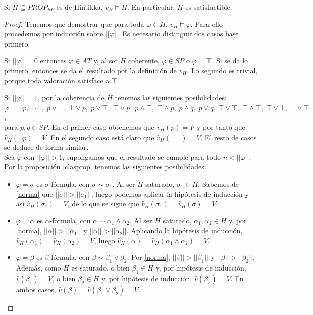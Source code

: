 \begin{prop}\label{hintisatis}
Si $H \subseteq PROP_{SP}$ es de Hintikka, $v_H \vDash H$. En particular, $H$ es satisfactible.
\end{prop}
\begin{proof}
Tenemos que demostrar que para toda $\varphi\in H$, $v_H \vDash \varphi$. Para ello procedemos por inducción sobre $||\varphi||$. Es necesario distinguir dos casos base primero.

Si $||\varphi|| = 0$ entonces $\varphi \in AT$ y, al ser $H$ coherente, $\varphi \in SP$ o $\varphi = \top$. Si se da lo primero, entonces se da el resultado por la definición de $v_H$. Lo segundo es trivial, porque toda valoración satisface a $\top$.

Si $||\varphi|| = 1$, por la coherencia de $H$ tenemos las siguientes posibilidades: \\[5pt]
$\varphi=\neg p,\;\neg\bot,\;p\lor\bot,\;\bot\lor p,\;p\lor\top,\;\top\lor p,\;p\land \top,\;\top\land p,\;p\land q,\;p\lor q,\;\top\lor\top,\;\top\land\top,\;\top\lor\bot,\;\bot\lor\top$,\\[5pt]
para $p,q \in SP$. En el primer caso obtenemos que $v_H(p) = F$ y por tanto que $\hat{v}_H(\neg p) = V$. En el segundo caso está claro que $\hat{v}_H(\neg \bot) = V$. El resto de casos se deduce de forma similar.\\

Sea $\varphi$ con $||\varphi|| > 1$, supongamos que el resultado se cumple para todo $ n<||\varphi||$. Por la proposición \ref{clasprop} tenemos las siguientes posibilidades:
\begin{itemize}
    \item $\varphi = \sigma$ es $\sigma$-fórmula, con $\sigma \sim \sigma_1$. Al ser $H$ saturado, $\sigma_1 \in H$. Sabemos de \ref{norma} que $||\sigma|| > ||\sigma_1||$, luego podemos aplicar la hipótesis de inducción y así $\hat{v}_H(\sigma_1) = V$, de lo que se sigue que $\hat{v}_H(\sigma_1) = \hat{v}_H(\sigma) = V$.
    \item $\varphi = \alpha$ es $\alpha$-fórmula, con $\alpha \sim \alpha_1 \land \alpha_2$. Al ser $H$ saturado, $\alpha_1, \alpha_2 \in H$ y, por \ref{norma},  $||\alpha|| > ||\alpha_1||$ y $||\alpha|| > ||\alpha_2||$. Aplicando la hipótesis de inducción, $\hat{v}_H(\alpha_1) = \hat{v}_H(\alpha_2)  = V$, luego $\hat{v}_H(\alpha) = \hat{v}_H(\alpha_1 \land \alpha_2) = V$.
    \item $\varphi = \beta$ es $\beta$-fórmula, con $\beta \sim \beta_1 \lor \beta_2$. Por \ref{norma},  $||\beta|| > ||\beta_1||$ y $||\beta|| > ||\beta_2||$. Además, como $H$ es saturado, o bien $\beta_1\in H$ y, por hipótesis de inducción, $\hat{v}(\beta_1)=V$, o bien $\beta_2\in H$ y, por hipótesis de inducción, $\hat{v}(\beta_2)=V$. En ambos casos, $\hat{v}(\beta)=\hat{v}(\beta_1\lor\beta_2)=V$.
\end{itemize}
\end{proof}


